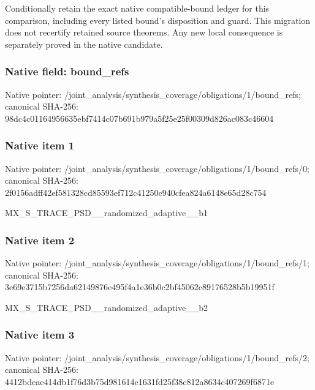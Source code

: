 \documentclass[10pt,a4paper]{article}
\begin{document}
\begingroup\raggedright\sloppy Conditionally retain the exact native compatible-bound ledger for this comparison,\allowbreak{} including every listed bound's disposition and guard. This migration does not recertify retained source theorems. Any new local consequence is separately proved in the native candidate.\par\endgroup

\subsubsection{Native field: bound\_\allowbreak{}refs}
Native pointer: /joint\_\allowbreak{}analysis/synthesis\_\allowbreak{}coverage/obligations/1/bound\_\allowbreak{}refs; canonical SHA-256: 98dc4c01164956635ebf7414c07b691b979a5f25e25f00309d826ac083c46604

\subsubsection{Native item 1}
Native pointer: /joint\_\allowbreak{}analysis/synthesis\_\allowbreak{}coverage/obligations/1/bound\_\allowbreak{}refs/0; canonical SHA-256: 2f0156adff42ef581328cd85593ef712c41250e940cfea824a6148e65d28c754

\begingroup\raggedright\sloppy MX\_\allowbreak{}S\_\allowbreak{}TRACE\_\allowbreak{}PSD\_\allowbreak{}\_\allowbreak{}randomized\_\allowbreak{}adaptive\_\allowbreak{}\_\allowbreak{}b1\par\endgroup

\subsubsection{Native item 2}
Native pointer: /joint\_\allowbreak{}analysis/synthesis\_\allowbreak{}coverage/obligations/1/bound\_\allowbreak{}refs/1; canonical SHA-256: 3e69e3715b7256da62149876e495f4a1e36b0c2bf45062c89176528b5b19951f

\begingroup\raggedright\sloppy MX\_\allowbreak{}S\_\allowbreak{}TRACE\_\allowbreak{}PSD\_\allowbreak{}\_\allowbreak{}randomized\_\allowbreak{}adaptive\_\allowbreak{}\_\allowbreak{}b2\par\endgroup

\subsubsection{Native item 3}
Native pointer: /joint\_\allowbreak{}analysis/synthesis\_\allowbreak{}coverage/obligations/1/bound\_\allowbreak{}refs/2; canonical SHA-256: 4412bdeae414db1f76d3b75d981614e1631fd25f38c812a8634c407269f6871e
\end{document}
